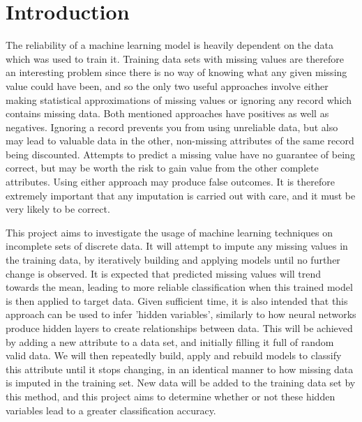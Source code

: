 \newpage
\chapter{Introduction}
The reliability of a machine learning model is heavily dependent on the data which was used to train it. Training data sets with missing values are therefore an interesting problem since there is no way of knowing what any given missing value could have been, and so the only two useful approaches involve either making statistical approximations of missing values or ignoring any record which contains missing data. Both mentioned approaches have positives as well as negatives. Ignoring a record prevents you from using unreliable data, but also may lead to valuable data in the other, non-missing attributes of the same record being discounted. Attempts to predict a missing value have no guarantee of being correct, but may be worth the risk to gain value from the other complete attributes. Using either approach may produce false outcomes. It is therefore extremely important that any imputation is carried out with care, and it must be very likely to be correct.

This project aims to investigate the usage of machine learning techniques on incomplete sets of discrete data. It will attempt to impute any missing values in the training data, by iteratively building and applying models until no further change is observed. It is expected that predicted missing values will trend towards the mean, leading to more reliable classification when this trained model is then applied to target data.  Given sufficient time, it is also intended that this approach can be used to infer 'hidden variables', similarly to how neural networks produce hidden layers to create relationships between data. This will be achieved by adding a new attribute to a data set, and initially filling it full of random valid data. We will then repeatedly build, apply and rebuild models to classify this attribute until it stops changing, in an identical manner to how missing data is imputed in the training set. New data will be added to the training data set by this method, and this project aims to determine whether or not these hidden variables lead to a greater classification accuracy. 
